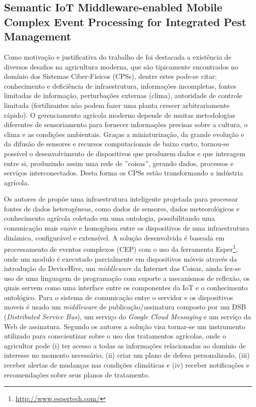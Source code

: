 \documentclass[ti,table]{texufpel} %
\begin{document}
  

\subsection{Semantic IoT Middleware-enabled Mobile Complex Event Processing for Integrated Pest Management} 

  

  

    Como motivação e justificativa do trabalho de \cite{art3nocera2017semantic} foi destacada a existência de diversos desafios na agricultura moderna, que são tipicamente encontrados no domínio dos Sistemas Ciber-Físicos (CPSs), dentre estes pode-se citar: conhecimento e deficiência de infraestrutura, informações incompletas, fontes limitadas de informação, perturbações externas (clima), autoridade de controle limitada (fertilizantes não podem fazer uma planta crescer arbitrariamente rápido). O gerenciamento agrícola moderno depende de muitas metodologias diferentes de sensoriamento para fornecer informações precisas sobre a cultura, o clima e as condições ambientais. Graças a miniaturização, da grande evolução e da difusão de sensores e recursos computacionais de baixo custo, tornou-se possível o desenvolvimento de dispositivos que produzem dados e que interagem entre si, produzindo assim uma rede de ''coisas'', gerando dados, processos e serviços interconectados. Desta forma os CPSs estão transformando a indústria agrícola. 

     

    Os autores de \cite{art3nocera2017semantic} propõe uma infraestrutura inteligente projetada para processar fontes de dados heterogêneas, como dados de sensores, dados meteorológicos e conhecimento agrícola coletado em uma ontologia, possibilitando uma comunicação mais suave e homogênea entre os dispositivos de uma infraestrutura dinâmica, configurável e extensível. A solução desenvolvida é baseada em processamento de eventos complexos (CEP) com o uso da ferramenta Esper\footnote{\url{http://www.espertech.com/}}, onde um modulo é executado parcialmente em dispositivos móveis através da introdução do DeviceHive, um \textit{middleware} da Internet das Coisas, ainda fez-se uso de uma linguagem de programação com suporte a mecanismos de reflexão, os quais servem como uma interface entre os componentes da IoT e o conhecimento ontológico. Para o sistema de comunicação entre o servidor e os dispositivos moveis é usado um \textit{middleware} de publicação/assinatura composto por um DSB (\textit{Distributed Service Bus}), um serviço do \textit{Google Cloud Messaging} e um serviço da Web de assinatura. Segundo os autores a solução visa tornar-se um instrumento utilizado para conscientizar sobre o uso dos tratamentos agrícolas, onde o agricultor pode (i) ter acesso a todas as informações relacionadas ao domínio de interesse no momento necessário, (ii) criar um plano de defesa personalizado, (iii) receber alertas de mudanças nas condições climáticas e (iv) receber notificações e recomendações sobre seus planos de tratamento. 
\end{document}
